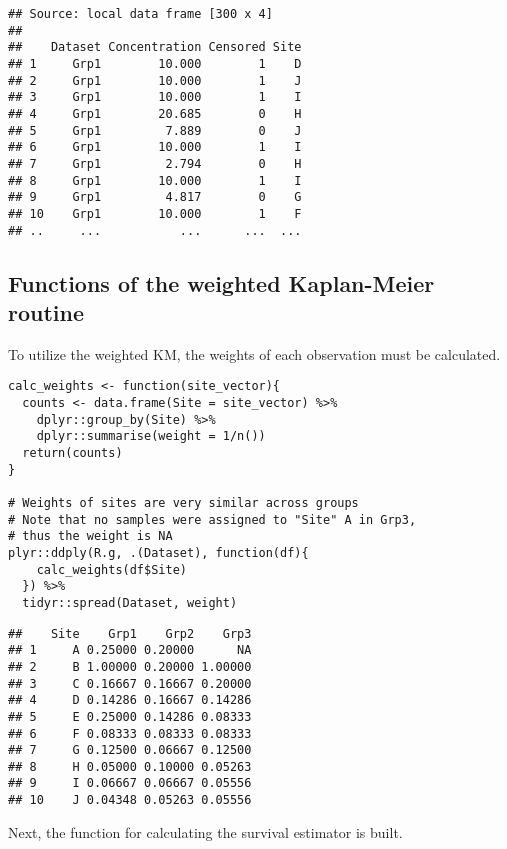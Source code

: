 \begin{verbatim}
## Source: local data frame [300 x 4]
## 
##    Dataset Concentration Censored Site
## 1     Grp1        10.000        1    D
## 2     Grp1        10.000        1    J
## 3     Grp1        10.000        1    I
## 4     Grp1        20.685        0    H
## 5     Grp1         7.889        0    J
## 6     Grp1        10.000        1    I
## 7     Grp1         2.794        0    H
## 8     Grp1        10.000        1    I
## 9     Grp1         4.817        0    G
## 10    Grp1        10.000        1    F
## ..     ...           ...      ...  ...
\end{verbatim}

\subsection{Functions of the weighted Kaplan-Meier routine}

To utilize the weighted KM, the weights of each observation must be calculated.

\begin{snugshade}
\begin{verbatim}
calc_weights <- function(site_vector){
  counts <- data.frame(Site = site_vector) %>%
    dplyr::group_by(Site) %>% 
    dplyr::summarise(weight = 1/n())
  return(counts)
}

# Weights of sites are very similar across groups
# Note that no samples were assigned to "Site" A in Grp3,
# thus the weight is NA
plyr::ddply(R.g, .(Dataset), function(df){
    calc_weights(df$Site)
  }) %>%
  tidyr::spread(Dataset, weight)
\end{verbatim}
\end{snugshade}

\begin{verbatim}
##    Site    Grp1    Grp2    Grp3
## 1     A 0.25000 0.20000      NA
## 2     B 1.00000 0.20000 1.00000
## 3     C 0.16667 0.16667 0.20000
## 4     D 0.14286 0.16667 0.14286
## 5     E 0.25000 0.14286 0.08333
## 6     F 0.08333 0.08333 0.08333
## 7     G 0.12500 0.06667 0.12500
## 8     H 0.05000 0.10000 0.05263
## 9     I 0.06667 0.06667 0.05556
## 10    J 0.04348 0.05263 0.05556
\end{verbatim}

Next, the function for calculating the survival estimator is built.

